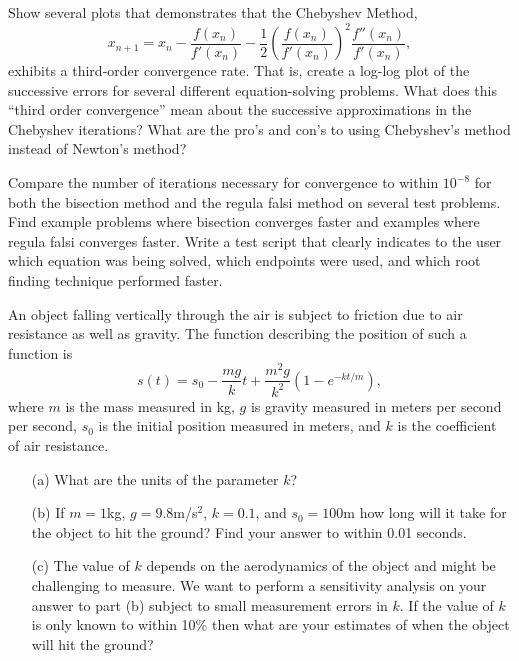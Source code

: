\begin{problem}
    Show several plots that demonstrates that the Chebyshev Method,
    \[ x_{n+1} = x_n - \frac{f(x_n)}{f'(x_n)} - \frac{1}{2} \left( \frac{f(x_n)}{f'(x_n)}
    \right)^2 \frac{f''(x_n)}{f'(x_n)}, \]
    exhibits a third-order convergence rate. That is, create a log-log plot of the
    successive errors for several different equation-solving problems.  What does this
    ``third order convergence'' mean about the successive
    approximations in the Chebyshev iterations?  What are the pro's and con's to using
    Chebyshev's method instead of Newton's method?
\end{problem}





\begin{problem}
    Compare the number of iterations necessary for convergence to within $10^{-8}$ for
    both the bisection method and the regula falsi method on several test problems. Find
    example problems where bisection converges faster and examples where regula falsi
    converges faster. Write a test script that clearly indicates to the user which
    equation was being solved, which endpoints were used, and which root finding technique
    performed faster.
\end{problem}

\begin{problem}
    An object falling vertically through the air is subject to friction due to air
    resistance as well as gravity.  The function describing the position of such a
    function is 
    \[ s(t) = s_0 - \frac{mg}{k} t + \frac{m^2 g}{k^2}\left( 1- e^{-kt/m} \right), \]
    where $m$ is the mass measured in kg, $g$ is gravity measured in meters per second per
    second, $s_0$ is the
    initial position measured in meters, and $k$ is the
    coefficient of air resistance.
    \begin{enumerate}
        \item[(a)] What are the units of the parameter $k$?
        \item[(b)] If $m = 1$kg, $g=9.8$m/s$^2$, $k=0.1$, and $s_0 = 100$m how long will it take
            for the object to hit the ground?  Find your answer to within 0.01 seconds.
        \item[(c)] The value of $k$ depends on the aerodynamics of the object and might be
            challenging to measure.  We want to perform a sensitivity analysis on your
            answer to part (b) subject to small measurement errors in $k$.  If the value
            of $k$ is only known to within 10\% then what are your estimates of when the
            object will hit the ground?
    \end{enumerate}
\end{problem}


